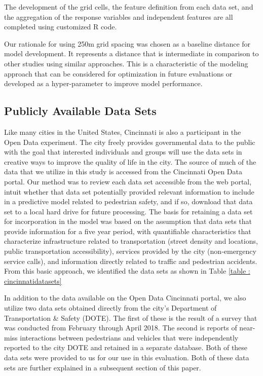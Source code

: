 \documentclass{llncs}
\begin{document}
The development of the grid cells, the feature definition from each data set, and the aggregation of the response variables and independent features are all completed using customized R code.

Our rationale for using 250m grid spacing was chosen as a baseline distance for model development. It represents a distance that is intermediate in comparison to other studies using similar approaches\cite{xie2017analysis}. This is a characteristic of the modeling approach that can be considered for optimization in future evaluations or developed as a hyper-parameter to improve model performance.


\subsection{Publicly Available Data Sets}

Like many cities in the United States, Cincinnati is also a participant in the Open Data experiment. The city freely provides governmental data to the public with the goal that interested individuals and groups will use the data sets in creative ways to improve the quality of life in the city. The source of much of the data that we utilize in this study is accessed from the Cincinnati Open Data portal. Our method was to review each data set accessible from the web portal, intuit whether that data set potentially provided relevant information to include in a predictive model related to pedestrian safety, and if so, download that data set to a local hard drive for future processing. The basis for retaining a data set for incorporation in the model was based on the assumption that data sets that provide information for a five year period, with quantifiable characteristics that characterize infrastructure related to transportation (street density and locations, public transportation accessibility), services provided by the city (non-emergency service calls), and information directly related to traffic and pedestrian accidents. From this basic approach, we identified the data sets as shown in Table \ref{table : cincinnatidatasets}

In addition to the data available on the Open Data Cincinnati portal, we also utilize two data sets obtained directly from the city's Department of Transportation \& Safety (DOTE). The first of these is the result of a survey that was conducted from February through April 2018. The second is reports of near-miss interactions between pedestrians and vehicles that were independently reported to the city DOTE and retained in a separate database. Both of these data sets were provided to us for our use in this evaluation. Both of these data sets are further explained in a subsequent section of this paper.
\end{document}
